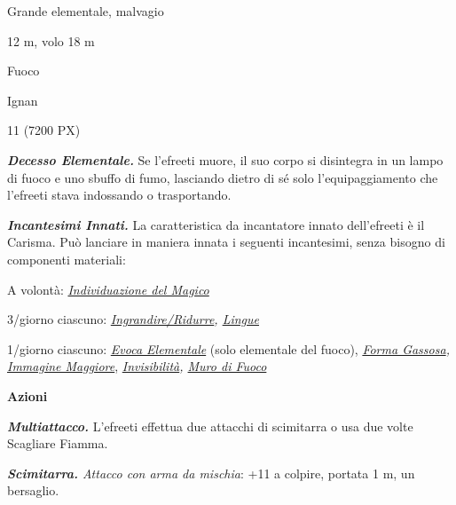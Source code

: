 \begin{multicols}{2}
{
\begin{description}[noitemsep, topsep=0pt, parsep=0pt, partopsep=0pt, itemsep=1pt, leftmargin=2.35cm,  labelwidth=2.2cm, itemindent=0cm, listparindent=0pt] %
\setlength{\baselineskip}{10pt}
\item[\textbf{Taglia/Tipo}] Grande elementale, malvagio
\item[\textbf{Caratt.}] 
\item[\textbf{Punti Ferita}] 
\item[\textbf{Movimento}] 12 m, volo 18 m
\item[\textbf{Tiri Salvez.}] 
\item[\textbf{Imm. Danni}] Fuoco
\item[\textbf{Sensi}] 
\item[\textbf{Linguaggi}] Ignan
\item[\textbf{Sfida}] 11 (7200 PX)
\end{description}
\smallskip

\emph{\textbf{Decesso Elementale.}} Se l'efreeti muore, il suo corpo si disintegra in un lampo di fuoco e uno sbuffo di fumo, lasciando dietro di sé solo l'equipaggiamento che l'efreeti stava indossando o trasportando.

\emph{\textbf{Incantesimi Innati.}} La caratteristica da incantatore innato dell'efreeti è il Carisma. Può lanciare in maniera innata i seguenti incantesimi, senza bisogno di componenti materiali:

A volontà: \emph{\hyperlink{Individuazione del Magico}{Individuazione del Magico}}

3/giorno ciascuno: \emph{\hyperlink{Ingrandire/Ridurre}{Ingrandire/Ridurre}, \hyperlink{Lingue}{Lingue}}

1/giorno ciascuno: \emph{\hyperlink{Evoca Elementale}{Evoca Elementale}} (solo elementale del fuoco), \emph{\hyperlink{Forma Gassosa}{Forma Gassosa}, \hyperlink{Immagine Maggiore}{Immagine Maggiore}}, \emph{\hyperlink{Invisibilità}{Invisibilità}, \hyperlink{Muro di Fuoco}{Muro di Fuoco}}

\textbf{Azioni}

\emph{\textbf{Multiattacco.}} L'efreeti effettua due attacchi di scimitarra o usa due volte Scagliare Fiamma.

\emph{\textbf{Scimitarra.} Attacco con arma da mischia}: +11 a colpire, portata 1 m, un bersaglio.

}
\end{multicols}

